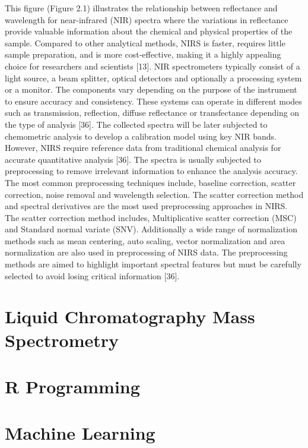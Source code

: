\documentclass[12pt,a4paper]{report}
\begin{document}
This figure (Figure 2.1)  illustrates the relationship between reflectance and wavelength for near-infrared (NIR) spectra where the variations in reflectance provide valuable information about the chemical and physical properties of the sample. Compared to other analytical methods, NIRS is faster, requires little sample preparation, and is more cost-effective, making it a highly appealing choice for researchers and scientists [13]. NIR spectrometers typically consist of a light source, 
a beam splitter, optical detectors and optionally a processing system or a  monitor. The components vary depending on the purpose of the instrument to ensure accuracy and consistency. These systems can operate in different modes such as transmission, reflection, diffuse reflectance or transfectance depending on the type of analysis [36]. The collected spectra will be later subjected to chemometric analysis to develop a calibration model using key NIR bands. However, NIRS require reference data from traditional chemical analysis for accurate quantitative analysis [36].
The spectra is usually subjected to preprocessing to remove irrelevant information to enhance the analysis accuracy. The most common preprocessing techniques include, baseline correction, scatter correction, noise removal and wavelength selection. The scatter correction method and spectral derivatives are the most used preprocessing approaches in NIRS. The scatter correction method includes, Multiplicative scatter correction (MSC) and Standard normal variate (SNV). Additionally a wide 
range of normalization methods such as mean centering, auto scaling, vector normalization and area normalization are also used in preprocessing of NIRS data. The preprocessing methods are aimed to highlight important spectral features but must be carefully selected to avoid losing critical information [36]. \\


\section{Liquid Chromatography Mass Spectrometry}
\section{R Programming}
\section{Machine Learning}
\end{document}
